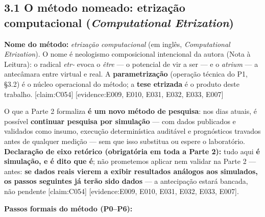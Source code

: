 \documentclass[
  12pt,
]{report}
\begin{document}
\hypertarget{o-muxe9todo-nomeado-etrizauxe7uxe3o-computacional-computational-etrization}{%
\subsection{\texorpdfstring{3.1 O método nomeado: etrização
computacional (\emph{Computational
Etrization})}{3.1 O método nomeado: etrização computacional (Computational Etrization)}}\label{o-muxe9todo-nomeado-etrizauxe7uxe3o-computacional-computational-etrization}}

\textbf{Nome do método:} \emph{etrização computacional} (em inglês,
\emph{Computational Etrization}). O nome é neologismo composicional
intencional da autora (Nota à Leitura): o radical \emph{etr-} evoca o
\emph{être} --- o potencial de vir a ser --- e o \emph{atrium} --- a
antecâmara entre virtual e real. A \textbf{parametrização} (operação
técnica do P1, §3.2) é o núcleo operacional do método; a \textbf{tese
etrizada} é o produto deste trabalho. {[}claim:C054{]} {[}evidence:E009,
E010, E031, E032, E033, E007{]}

O que a Parte 2 formaliza \textbf{é um novo método de pesquisa}: nos
dias atuais, é possível \textbf{continuar pesquisa por simulação} ---
com dados publicados e validados como insumo, execução determinística
auditável e prognósticos travados antes de qualquer medição --- sem que
isso substitua ou espere o laboratório. \textbf{Declaração de eixo
retórico (obrigatória em toda a Parte 2):} tudo aqui \textbf{é
simulação, e é dito que é}; não prometemos aplicar nem validar na Parte
2 --- antes: \textbf{se dados reais vierem a exibir resultados análogos
aos simulados, os passos seguintes já terão sido dados} --- a
antecipação estará bancada, não pendente {[}claim:C054{]}
{[}evidence:E009, E010, E031, E032, E033, E007{]}.

\textbf{Passos formais do método (P0--P6):}
\end{document}
